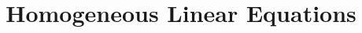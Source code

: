 \documentclass{ximera}
\title[Dig-In:]{Homogeneous Linear Equations}
\begin{document}
\begin{abstract}
  
\end{abstract}
\maketitle
\end{document}
